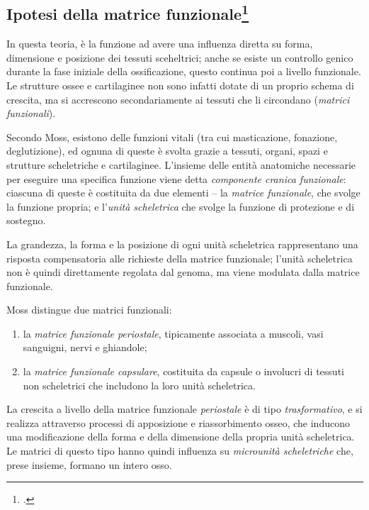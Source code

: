 \subsection*{Ipotesi della matrice funzionale\protect\footcite{Moss1960,Moss1969}}
In questa teoria, è la funzione ad avere una influenza diretta su forma, dimensione e posizione dei tessuti sceheltrici; anche se esiste un controllo genico durante la fase iniziale della ossificazione, questo continua poi a livello funzionale. Le strutture ossee e cartilaginee non sono infatti dotate di un proprio schema di crescita, ma si accrescono secondariamente ai tessuti che li circondano (\textit{matrici funzionali}).

Secondo Moss, esistono delle funzioni vitali (tra cui masticazione, fonazione, deglutizione), ed ognuna di queste è svolta grazie a tessuti, organi, spazi e strutture scheletriche e cartilaginee. L'insieme delle entità anatomiche necessarie per eseguire una specifica funzione viene detta \textit{componente cranica funzionale}: ciascuna di queste è costituita da due elementi -- la \textit{matrice funzionale}, che svolge la funzione propria; e l'\textit{unità scheletrica} che svolge la funzione di protezione e di sostegno.

La grandezza, la forma e la posizione di ogni unità scheletrica rappresentano una risposta compensatoria alle richieste della matrice funzionale; l'unità scheletrica non è quindi direttamente regolata dal genoma, ma viene modulata dalla matrice funzionale.

Moss distingue due matrici funzionali:

\begin{enumerate}
\item la \textit{matrice funzionale periostale}, tipicamente associata a muscoli, vasi sanguigni, nervi e ghiandole;
\item la \textit{matrice funzionale capsulare}, costituita da capsule o involucri di tessuti non scheletrici che includono la loro unità scheletrica.
\end{enumerate}

La crescita a livello della matrice funzionale \textit{periostale} è di tipo \textit{trasformativo}, e si realizza attraverso processi di apposizione e riassorbimento osseo, che inducono una modificazione della forma e della dimensione della propria unità scheletrica. Le matrici di questo tipo hanno quindi influenza su \textit{microunità scheletriche} che, prese insieme, formano un intero osso.

